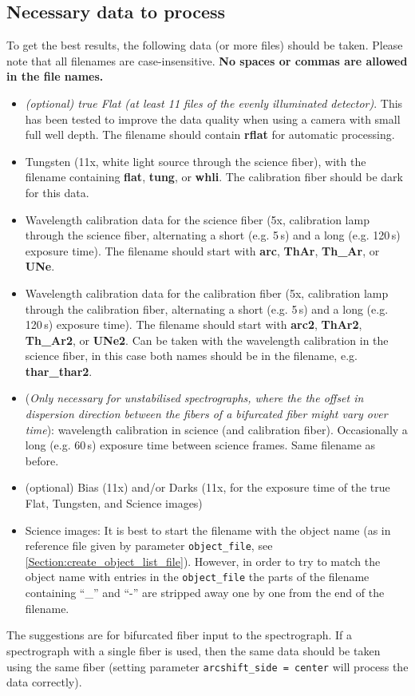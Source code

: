 \documentclass[10pt,a4paper]{article}
\begin{document}
\subsection{Necessary data to process}

To get the best results, the following data (or more files) should be taken. Please note that all filenames are case-insensitive. \textbf{No spaces or commas are allowed in the file names.}
\begin{itemize}
  \item \textit{(optional) true Flat (at least 11 files of the evenly illuminated detector)}. This has been tested to improve the data quality when using a camera with small full well depth. The filename should contain \textbf{rflat} for automatic processing.
  \item Tungsten (11x, white light source through the science fiber), with the filename containing \textbf{flat}, \textbf{tung}, or \textbf{whli}. The calibration fiber should be dark for this data.
  \item Wavelength calibration data for the science fiber (5x, calibration lamp through the science fiber, alternating a short (e.g. 5\,s) and a long (e.g. 120\,s) exposure time). The filename should start with \textbf{arc}, \textbf{ThAr}, \textbf{Th\_Ar}, or \textbf{UNe}.
  \item Wavelength calibration data for the calibration fiber (5x, calibration lamp through the calibration fiber, alternating a short (e.g. 5\,s) and a long (e.g. 120\,s) exposure time). The filename should start with \textbf{arc2}, \textbf{ThAr2}, \textbf{Th\_Ar2}, or \textbf{UNe2}. Can be taken with the wavelength calibration in the science fiber, in this case both names should be in the filename, e.g.  \textbf{thar\_thar2}.
  \item (\textit{Only necessary for unstabilised spectrographs, where the the offset in dispersion direction between the fibers of a bifurcated fiber might vary over time}): wavelength calibration in science (and calibration fiber). Occasionally a long (e.g. 60\,s) exposure time between science frames. Same filename as before.
  \item (optional) Bias (11x) and/or Darks (11x, for the exposure time of the true Flat, Tungsten, and Science images)%
  \item Science images: It is best to start the filename with the object name (as in reference file given by parameter \verb|object_file|, see \ref{Section:create_object_list_file}). However, in order to try to match the object name with entries in the \verb|object_file| the parts of the filename containing ``\_'' and ``-'' are stripped away one by one from the end of the filename.
\end{itemize}
The suggestions are for bifurcated fiber input to the spectrograph. If a spectrograph with a single fiber is used, then the same data should be taken using the same fiber (setting parameter \verb|arcshift_side = center| will process the data correctly).
\end{document}
